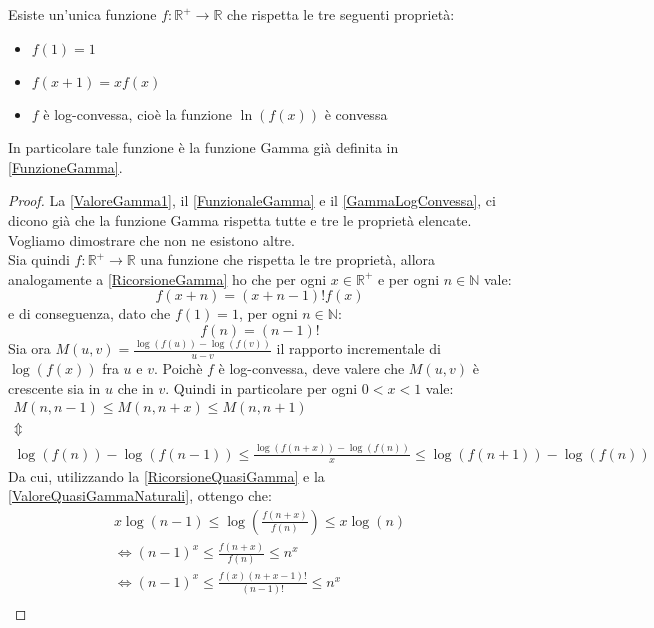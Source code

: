  \begin{theorem}
 \label{BohrMollerup}
Esiste un'unica funzione $f :\mathbb{R}^{+}\to\mathbb{R} $ che rispetta le tre seguenti proprietà:
\begin{itemize}
 \item $f(1)=1$
 \item $f(x+1)=xf(x)$
 \item $f$ è log-convessa, cioè la funzione $\ln(f(x))$ è convessa
\end{itemize}
In particolare tale funzione è la funzione Gamma già definita in \cref{FunzioneGamma}.
 \end{theorem}
 \begin{proof}
  La \cref{ValoreGamma1}, il \cref{FunzionaleGamma} e il \cref{GammaLogConvessa}, ci dicono già che la funzione
  Gamma rispetta tutte e tre le proprietà elencate. Vogliamo dimostrare che non ne esistono altre.\\
  Sia quindi $f:\mathbb{R^+}\to\mathbb{R}$ una funzione che rispetta le tre proprietà, allora analogamente a 
  \cref{RicorsioneGamma} ho che per ogni $x\in \mathbb{R^+}$ e per ogni $n\in\mathbb{N}$ vale:
  \begin{equation}\label{RicorsioneQuasiGamma}
   f(x+n)=(x+n-1)!f(x)
  \end{equation}
  e di conseguenza, dato che $f(1)=1$, per ogni $n\in\mathbb{N}$:
  \begin{equation}\label{ValoreQuasiGammaNaturali}
   f(n)=(n-1)!
  \end{equation}
  Sia ora $M(u,v)=\frac{\log(f(u))-\log(f(v))}{u-v}$ il rapporto incrementale
di $\log(f(x))$ fra $u$ e $v$. Poichè $f$ è log-convessa, deve valere che $M(u,v)$ è crescente sia in $u$ che in $v$.
Quindi in particolare per ogni $0<x<1$ vale:
\begin{gather*}
  M(n,n-1) \le M(n,n+x) \le M(n,n+1) \\
  \Updownarrow \\
  \log(f(n))-\log(f(n-1)) \le \frac{\log(f(n+x))-\log(f(n))}{x} \le \log(f(n+1))-\log(f(n)) 
  \end{gather*}
Da cui, utilizzando la \cref{RicorsioneQuasiGamma} e la \cref{ValoreQuasiGammaNaturali}, ottengo che:
\begin{gather*}
  x \log(n-1) \le \log \left( \frac{f(n+x)}{f(n)} \right) \le x\log(n)\\
  \iff (n-1)^x \le \frac{f(n+x)}{f(n)} \le n^x \\
  \iff (n-1)^x \le  \frac{f(x)(n+x-1)!}{(n-1)!}  \le n^x \\

\end{gather*}
\end{proof}
